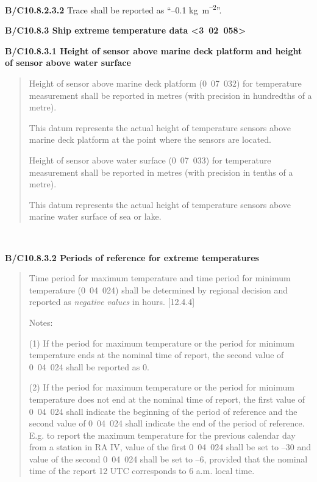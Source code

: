 \textbf{B/C10.8.2.3.2} Trace shall be reported as ``--0.1 kg~m\textsuperscript{--2}''.

\textbf{B/C10.8.3 Ship extreme temperature data \textless3~02~058\textgreater{}}

\textbf{B/C10.8.3.1 Height of sensor above marine deck platform and height of sensor above water surface}

\begin{quote}
Height of sensor above marine deck platform (0~07~032) for temperature measurement shall be reported in metres (with precision in hundredths of a metre).

This datum represents the actual height of temperature sensors above marine deck platform at the point where the sensors are located.

Height of sensor above water surface (0~07~033) for temperature measurement shall be reported in metres (with precision in tenths of a metre).

This datum represents the actual height of temperature sensors above marine water surface of sea or lake.
\end{quote}

\textbf{\\
}

\textbf{B/C10.8.3.2 Periods of reference for extreme temperatures}

\begin{quote}
Time period for maximum temperature and time period for minimum temperature (0~04~024) shall be determined by regional decision and reported as \emph{negative values} in hours. {[}12.4.4{]}

Notes:

(1) If the period for maximum temperature or the period for minimum temperature ends at the nominal time of report, the second value of 0~04~024 shall be reported as 0.

(2) If the period for maximum temperature or the period for minimum temperature does not end at the nominal time of report, the first value of 0~04~024 shall indicate the beginning of the period of reference and the second value of 0~04~024 shall indicate the end of the period of reference. E.g. to report the maximum temperature for the previous calendar day from a station in RA IV, value of the first 0~04~024 shall be set to --30 and value of the second 0~04~024 shall be set to --6, provided that the nominal time of the report 12 UTC corresponds to 6 a.m. local time.
\end{quote}

